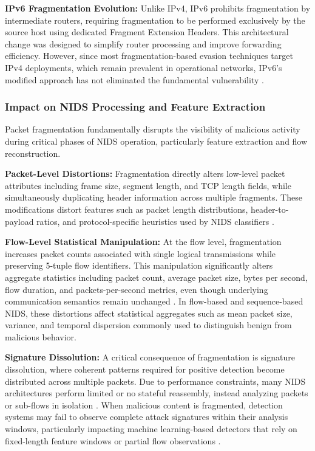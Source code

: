 \textbf{IPv6 Fragmentation Evolution:}
Unlike IPv4, IPv6 prohibits fragmentation by intermediate routers, requiring fragmentation to be performed exclusively by the source host using dedicated Fragment Extension Headers. This architectural change was designed to simplify router processing and improve forwarding efficiency. However, since most fragmentation-based evasion techniques target IPv4 deployments, which remain prevalent in operational networks, IPv6's modified approach has not eliminated the fundamental vulnerability \cite{bittau2005fragmentation}.

\subsubsection{Impact on NIDS Processing and Feature Extraction}

Packet fragmentation fundamentally disrupts the visibility of malicious activity during critical phases of NIDS operation, particularly feature extraction and flow reconstruction.

\textbf{Packet-Level Distortions:}
Fragmentation directly alters low-level packet attributes including frame size, segment length, and TCP length fields, while simultaneously duplicating header information across multiple fragments. These modifications distort features such as packet length distributions, header-to-payload ratios, and protocol-specific heuristics used by NIDS classifiers \cite{abdelaty2021gadot}.

\textbf{Flow-Level Statistical Manipulation:}
At the flow level, fragmentation increases packet counts associated with single logical transmissions while preserving 5-tuple flow identifiers. This manipulation significantly alters aggregate statistics including packet count, average packet size, bytes per second, flow duration, and packets-per-second metrics, even though underlying communication semantics remain unchanged \cite{cui2023cbseq}. In flow-based and sequence-based NIDS, these distortions affect statistical aggregates such as mean packet size, variance, and temporal dispersion commonly used to distinguish benign from malicious behavior.

\textbf{Signature Dissolution:}
A critical consequence of fragmentation is signature dissolution, where coherent patterns required for positive detection become distributed across multiple packets. Due to performance constraints, many NIDS architectures perform limited or no stateful reassembly, instead analyzing packets or sub-flows in isolation \cite{md2025guardians}. When malicious content is fragmented, detection systems may fail to observe complete attack signatures within their analysis windows, particularly impacting machine learning-based detectors that rely on fixed-length feature windows or partial flow observations \cite{abdelaty2021gadot}.

